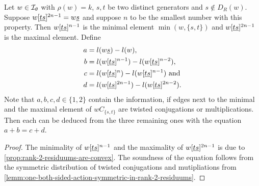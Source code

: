 \begin{coro}
	Let $w \in \mathcal{I}_{\theta}$ with $\rho(w) = k$, $s,t$ be two distinct generators and $s \notin D_R(w)$. Suppose $w[\underline{t} \underline{s}]^{2n-1} = w \underline{s}$ and suppose $n$ to be the smallest number with this property. Then $w[\underline{t} \underline{s}]^{n-1}$ is the minimal element $\min(w,\{s,t\})$ and $w[\underline{t} \underline{s}]^{2n-1}$ is the maximal element. Define
	\begin{align*}
		a & = l(w \underline{s}) - l(w), \\
		b & = l(w[\underline{t} \underline{s}]^{n-1}) - l(w[\underline{t} \underline{s}]^{n-2}), \\
		c & = l(w[\underline{t} \underline{s}]^{n}) - l(w[\underline{t} \underline{s}]^{n-1}) \textrm{ and} \\
		d & = l(w[\underline{t} \underline{s}]^{2n-1}) - l(w[\underline{t} \underline{s}]^{2n-2}).
	\end{align*}
	Note that $a,b,c,d \in \{1,2\}$ contain the information, if edges next to the minimal and the maximal element of $wC_{\{s,t\}}$ are twisted conjugations or multiplications. Then each can be deduced from the three remaining ones with the equation $a+b=c+d$.

	\begin{proof}
		The minimality of $w[\underline{t} \underline{s}]^{n-1}$ and the maximality of $w[\underline{t} \underline{s}]^{2n-1}$ is due to \ref{prop:rank-2-residuums-are-convex}. The soundness of the equation follows from the symmetric distribution of twisted conjugations and mutipliations from \ref{lemm:one-both-sided-action-symmetric-in-rank-2-residuums}.
	\end{proof}
\end{coro}

